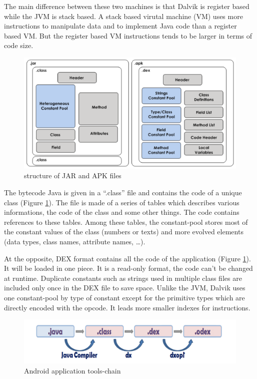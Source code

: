 \documentclass{sig-alternate}
\def \DALVIK{Dalvik\xspace}
\def \ANDROID{Android\xspace}
\def \JVM{JVM\xspace}
\def \DEX{DEX\xspace}
\begin{document}
      The main difference between these two machines is that \DALVIK is register based while the \JVM is stack based.
      A stack based virutal machine (VM) uses more instructions to manipulate data and to implement Java code than a register based VM.
      But the register based VM instructions tends to be larger in terms of code size\cite{ieee-paul-kundu-energy-perspective}.

      \begin{figure}[!h]
        \centering \includegraphics[width=\columnwidth]{structure-jar-apk.png}
        \caption{structure of JAR and APK files}
        \label{SJA}
      \end{figure}

      The bytecode Java is given in a ``.class'' file and contains the code of a unique class (Figure \ref{SJA}).
      The file is made of a series of tables which describes various informations, the code of the class and some other things.
      The code contains references to these tables.
      Among these tables, the constant-pool stores most of the constant values of the class (numbers or texts)
      and more evolved elements (data types, class names, attribute names, \dots).

      At the opposite, \DEX format contains all the code of the application (Figure \ref{SJA}).
      It will be loaded in one piece.
      It is a read-only format, the code can't be changed at runtime.
      Duplicate constants such as strings used in multiple class files
      are included only once in the \DEX file to save space.
      Unlike the \JVM, \DALVIK uses one constant-pool by type of constant
      except for the primitive types which are directly encoded with the opcode.
      It leads more smaller indexes for instructions.\\

      \begin{figure}[!h]
        \centering \includegraphics[width=\columnwidth]{dex-tools-chain.png}
        \caption{\ANDROID application tools-chain}
        \label{DTC}
      \end{figure}
\end{document}
